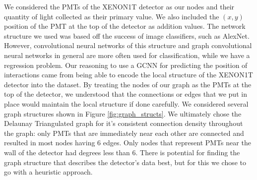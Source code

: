 \par We considered the PMTs of the XENON1T detector as our nodes and their quantity of light collected as their primary value.
We also included the $(x,y)$ position of the PMT at the top of the detector as addition values.
The network structure we used was based off the success of image classifiers, such as AlexNet.
However, convolutional neural networks of this structure and graph convolutional neural networks in general are more often used for classification, while we have a regression problem.
Our reasoning to use a GCNN for predicting the position of interactions came from being able to encode the local structure of the XENON1T detector into the dataset.
By treating the nodes of our graph as the PMTs at the top of the detector, we understood that the connections or edges that we put in place would maintain the local structure if done carefully.
We considered several graph structures shown in Figure \ref{fig:graph_structs}.
We ultimately chose the Delaunay Triangulated graph for it's consistent connection density throughout the graph: only PMTs that are immediately near each other are connected and resulted in most nodes having 6 edges.
Only nodes that represent PMTs near the wall of the detector had degrees less than 6.
There is potential for finding the graph structure that describes the detector's data best, but for this we chose to go with a heuristic approach.
